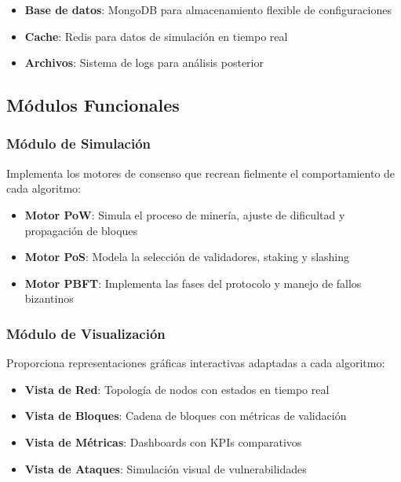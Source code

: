 \documentclass[spanish,12pt,letterpaper]{report}
\begin{document}
\begin{itemize}
    \item \textbf{Base de datos}: MongoDB para almacenamiento flexible de configuraciones
    \item \textbf{Cache}: Redis para datos de simulación en tiempo real
    \item \textbf{Archivos}: Sistema de logs para análisis posterior
\end{itemize}

\subsection{Módulos Funcionales}

\subsubsection{Módulo de Simulación}

Implementa los motores de consenso que recrean fielmente el comportamiento de cada algoritmo:

\begin{itemize}
    \item \textbf{Motor PoW}: Simula el proceso de minería, ajuste de dificultad y propagación de bloques
    \item \textbf{Motor PoS}: Modela la selección de validadores, staking y slashing
    \item \textbf{Motor PBFT}: Implementa las fases del protocolo y manejo de fallos bizantinos
\end{itemize}

\subsubsection{Módulo de Visualización}

Proporciona representaciones gráficas interactivas adaptadas a cada algoritmo:

\begin{itemize}
    \item \textbf{Vista de Red}: Topología de nodos con estados en tiempo real
    \item \textbf{Vista de Bloques}: Cadena de bloques con métricas de validación
    \item \textbf{Vista de Métricas}: Dashboards con KPIs comparativos
    \item \textbf{Vista de Ataques}: Simulación visual de vulnerabilidades
\end{itemize}
\end{document}
